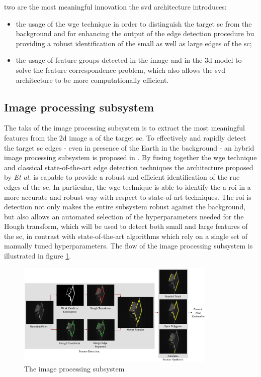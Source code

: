 two are the most meaningful innovation the \acrshort{svd} architecture introduces:
\begin{itemize}
\item the usage of the \acrshort{wge} technique in order to distinguish the target \acrshort{sc} from the background and for enhancing the output of the edge detection procedure bu providing a robust identification of the small as well as large edges of the \acrshort{sc};
\item the usage of feature groups detected in the image and in the \acrshort{3d} model to solve the feature correspondence problem, which also allows the \acrshort{svd} architecture to be more computationally efficient.  
\end{itemize}

\subsection{Image processing subsystem}
The taks of the image processing subsystem is to extract the most meaningful features from the \acrshort{2d} image a of the target \acrshort{sc}. To effectively and rapidly detect the target \acrshort{sc} edges - even in presence of the Earth in the background - an hybrid image processing subsystem is proposed in \cite{Sharma2018}. 
By fusing together the \acrshort{wge} technique and classical state-of-the-art edge detection techniques the architecture proposed by \textit{Et al.} is capable to provide a robust and efficient identification of the rue edges of the \acrshort{sc}.
In particular, the \acrshort{wge} technique is able to identify the a \acrfull{roi} in a more accurate and robust way with respect to state-of-art techniques. The \acrshort{roi} is detection not only makes the entire subsystem robust against the background, but also allows an automated selection of the hyperparameters needed for the Hough transform, which will be used to detect both small and large features of the \acrshort{sc}, in contrast with state-of-the-art algorithms which rely on a single set of manually tuned hyperparameters.
The flow of the image processing subsystem is illustrated in figure \ref{fig:imageProcessingSubsystem}.

\begin{figure}[htbp]
  \centering
  \includegraphics[width=0.85\textwidth]{gfx/imageProcessingSubsystem.eps}
  \caption{The image processing subsystem \cite{Sharma2018}}
  \label{fig:imageProcessingSubsystem}
\end{figure}

